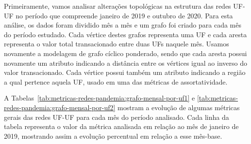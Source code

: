 Primeiramente, vamos analisar alterações topológicas na estrutura das redes UF-UF no período que compreende janeiro de 2019 e outubro de 2020. Para esta análise, os dados foram dividido mês a mês e um grafo foi criado para cada mês do período estudado. Cada vértice destes grafos representa uma UF e cada aresta representa o valor total transacionado entre duas UFs naquele mês. Usamos novamente a modelagem de grafo cíclico ponderado, sendo que cada aresta possui novamente um atributo indicando a distância entre os vértices igual ao inverso do valor transacionado. Cada vértice possui também um atributo indicando a região a qual pertence aquela UF, usado em uma das métricas de assortatividade.

A Tabelas~\ref{tab:metricas-redes-pandemia:grafo-mensal-por-uf1} e \ref{tab:metricas-redes-pandemia:grafo-mensal-por-uf2} mostram a evolução de algumas métricas gerais das redes UF-UF para cada mês do período analisado. Cada linha da tabela representa o valor da métrica analisada em relação ao mês de janeiro de 2019, mostrando assim a evolução percentual em relação a esse mês-base.

